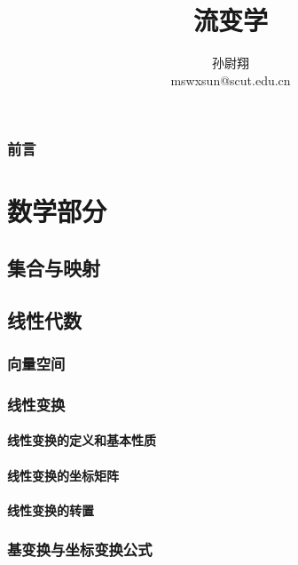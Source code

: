 \documentclass[zihao=-4,linespread=1.5,a4paper,heading=true,twoside]{ctexbook}
\title{流变学}
\author{孙尉翔\\mswxsun@scut.edu.cn}
\theoremstyle{definition}
\theoremstyle{plain}
\begin{document}
\section*{前言}\label{sec:preface}

\tableofcontents

\part{数学部分}
\chapter{集合与映射}\label{sec:II.1}
\label{sec:II.1.1}
\label{sec:II.1.2}
\label{sec:II.1.3}

\chapter{线性代数}\label{sec:II.2}
\section{向量空间}\label{sec:II.2.1}


\section{线性变换}\label{sec:II.2.2}
\subsection{线性变换的定义和基本性质}\label{sec:II.2.2.1}


\subsection{线性变换的坐标矩阵}\label{sec:II.2.2.2}


\subsection{线性变换的转置}\label{sec:II.2.2.3}


\section{基变换与坐标变换公式}\label{sec:II.2.3}

\end{document}
